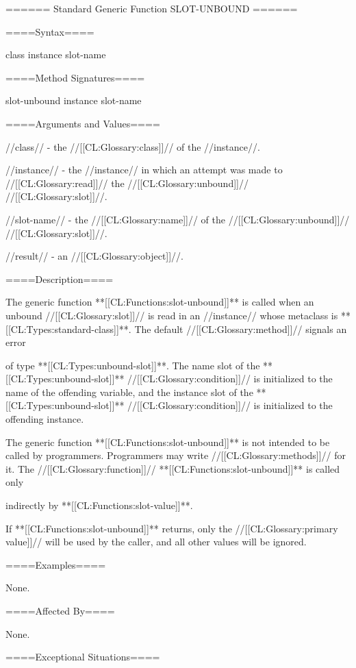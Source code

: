 ====== Standard Generic Function SLOT-UNBOUND ======

====Syntax====

 {class instance slot-name} {}

====Method Signatures====

\Defmeth slot-unbound { instance slot-name}

====Arguments and Values====

//class// - the //[[CL:Glossary:class]]// of the //instance//.

//instance// - the //instance// in which an attempt was made to //[[CL:Glossary:read]]// the //[[CL:Glossary:unbound]]// //[[CL:Glossary:slot]]//.

//slot-name// - the //[[CL:Glossary:name]]// of the //[[CL:Glossary:unbound]]// //[[CL:Glossary:slot]]//.

//result// - an //[[CL:Glossary:object]]//.

====Description====

The generic function **[[CL:Functions:slot-unbound]]** is called when an unbound //[[CL:Glossary:slot]]// is read in an //instance// whose metaclass is **[[CL:Types:standard-class]]**. The default //[[CL:Glossary:method]]// signals an error

of type **[[CL:Types:unbound-slot]]**. The name slot of the **[[CL:Types:unbound-slot]]** //[[CL:Glossary:condition]]// is initialized to the name of the offending variable, and the instance slot of the **[[CL:Types:unbound-slot]]** //[[CL:Glossary:condition]]// is initialized to the offending instance.



The generic function **[[CL:Functions:slot-unbound]]** is not intended to be called by programmers. Programmers may write //[[CL:Glossary:methods]]// for it. The //[[CL:Glossary:function]]// **[[CL:Functions:slot-unbound]]** is called only

indirectly by **[[CL:Functions:slot-value]]**.


If **[[CL:Functions:slot-unbound]]** returns, only the //[[CL:Glossary:primary value]]// will be used by the caller, and all other values will be ignored.

====Examples====

None.

====Affected By====

None.

====Exceptional Situations====

